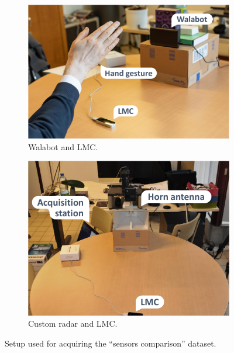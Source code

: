 \begin{figure}[t]
    \centering
    \begin{subfigure}{.53\linewidth}
        \centering
        \includegraphics[width=\linewidth]{Figures/RadarExperiments/Datasets/SensorsComparison/setup-walabot-lmc.pdf}
        \captionsetup{width=.99\linewidth}
        \caption{Walabot and LMC.}
        \label{fig:radar-experiments:setup-sensors-comparison:walabot-lmc}
    \end{subfigure}
    \begin{subfigure}{.46\linewidth}
        \centering
        \includegraphics[width=\linewidth]{Figures/RadarExperiments/Datasets/SensorsComparison/setup-horn-lmc.pdf}
        \captionsetup{width=.99\linewidth}
        \caption{Custom radar and LMC.}
        \label{fig:radar-experiments:setup-sensors-comparison:horn-lmc}
    \end{subfigure}
    \vspace{-16pt}
    \caption{Setup used for acquiring the ``sensors comparison'' dataset.}
    \label{fig:radar-experiments:setup-sensors-comparison}
\end{figure}

